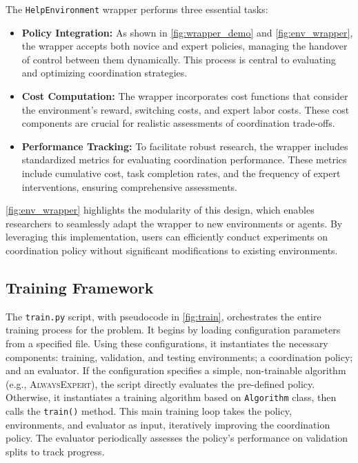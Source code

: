 The \texttt{HelpEnvironment} wrapper performs three essential tasks: \begin{itemize}
    \item \textbf{Policy Integration:} As shown in \autoref{fig:wrapper_demo} and \autoref{fig:env_wrapper}, the wrapper accepts both novice and expert policies, managing the handover of control between them dynamically. This process is central to evaluating and optimizing coordination strategies.
    \item \textbf{Cost Computation:} The wrapper incorporates cost functions that consider the environment's reward, switching costs, and expert labor costs. These cost components are crucial for realistic assessments of coordination trade-offs.
    \item \textbf{Performance Tracking:} To facilitate robust research, the wrapper includes standardized metrics for evaluating coordination performance. These metrics include cumulative cost, task completion rates, and the frequency of expert interventions, ensuring comprehensive assessments.
\end{itemize}

\autoref{fig:env_wrapper} highlights the modularity of this design, which enables researchers to seamlessly adapt the wrapper to new environments or agents. By leveraging this implementation, users can efficiently conduct experiments on coordination policy without significant modifications to existing environments.



\subsection{Training Framework}



The \texttt{train.py} script, with pseudocode in \autoref{fig:train}, orchestrates the entire training process for the \ourMethod problem.  It begins by loading configuration parameters from a specified file. Using these configurations, it instantiates the necessary components: training, validation, and testing environments; a coordination policy; and an evaluator.  If the configuration specifies a simple, non-trainable algorithm (e.g., \textsc{AlwaysExpert}), the script directly evaluates the pre-defined policy. Otherwise, it instantiates a training algorithm based on \texttt{Algorithm} class, then calls the \texttt{train()} method. This main training loop takes the policy, environments, and evaluator as input, iteratively improving the coordination policy. The evaluator periodically assesses the policy's performance on validation splits to track progress.





